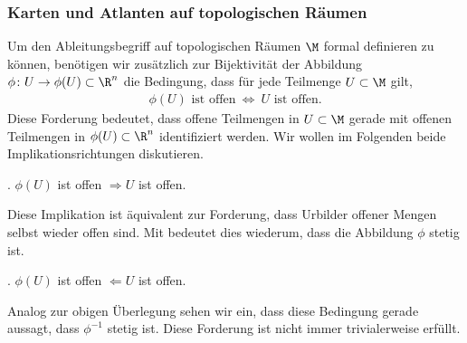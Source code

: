 \documentclass[letterpaper,10pt,german]{jupyterBook}
\begin{document}
\subsubsection{Karten und Atlanten auf topologischen Räumen}
\label{\detokenize{manifolds/manifolds_prelim:karten-und-atlanten-auf-topologischen-raumen}}
\sphinxAtStartPar
Um den Ableitungsbegriff auf topologischen Räumen \(\M\) formal definieren zu können, benötigen wir zusätzlich zur Bijektivität der Abbildung \(\phi \colon U \rightarrow \phi(U) \subset \R^n\) die Bedingung, dass für jede Teilmenge \(U \subset \M\) gilt,
\begin{equation*}
\begin{split}\phi(U)\text{ ist offen} \ \Leftrightarrow \ U \text{ ist offen}.\end{split}
\end{equation*}
\sphinxAtStartPar
Diese Forderung bedeutet, dass offene Teilmengen in \(U \subset \M\) gerade mit offenen Teilmengen in \(\phi(U) \subset \R^n\) identifiziert werden.
Wir wollen im Folgenden beide Implikationsrichtungen diskutieren.

. \(\phi(U)\) ist offen \(\Rightarrow U \) ist offen.

\sphinxAtStartPar
Diese Implikation ist äquivalent zur Forderung, dass Urbilder offener Mengen selbst wieder offen sind.
Mit {\hyperref[\detokenize{manifolds/manifolds_prelim:def:stetigkeitTopologie}]{}} bedeutet dies wiederum, dass die Abbildung \(\phi\) stetig ist.

. \(\phi(U)\) ist offen \(\Leftarrow U \) ist offen.

\sphinxAtStartPar
Analog zur obigen Überlegung sehen wir ein, dass diese Bedingung gerade aussagt, dass \(\phi^{-1}\) stetig ist.
Diese Forderung ist nicht immer trivialerweise erfüllt.
\end{document}
